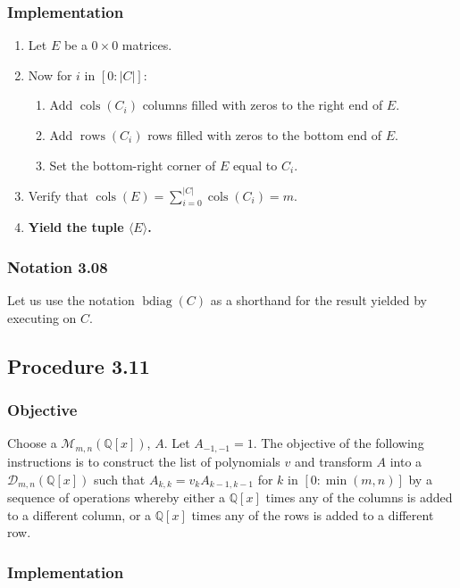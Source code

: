 \documentclass[twocolumn]{article}
\DeclareMathOperator{\bdiag}{bdiag}
\DeclareMathOperator{\cols}{cols}
\DeclareMathOperator{\rows}{rows}
\newcommand{\notation}[1]{\subsubsection*{Notation #1}}
\newcommand{\procedure}[2][]{\subsection*{Procedure #2 \ifthenelse{\equal{#1}{}}{}{(#1)}}\label{sec:procedure #2}}
\newcommand{\objective}{\subsubsection*{Objective}}
\newcommand{\implementation}{\subsubsection*{Implementation}}
\newcommand{\procedurehr}[2][]{\hyperref[sec:procedure #2]{\ifthenelse{\equal{#1}{}}{procedure #2}{#1}}}
\begin{document}
			\implementation
				\begin{enumerate}
					\item Let $E$ be a $0\times 0$ matrices.
					\item Now for $i$ in $[0:\lvert C\rvert]$:
					\begin{enumerate}
						\item Add $\cols(C_i)$ columns filled with zeros to the right end of $E$.
						\item Add $\rows(C_i)$ rows filled with zeros to the bottom end of $E$.
						\item Set the bottom-right corner of $E$ equal to $C_i$.
					\end{enumerate}
					\item Verify that $\cols(E)=\sum_{i=0}^{\lvert C\rvert}\cols(C_i)=m$.
					\item \textbf{Yield the tuple $\langle E\rangle$.}
				\end{enumerate}
		\notation{3.08}
			Let us use the notation $\bdiag(C)$ as a shorthand for the result yielded by executing \procedurehr{3.10} on $C$.
		\procedure{3.11}
			\objective
				Choose a $\mathcal{M}_{m,n}(\mathbb{Q}[x])$, $A$. Let $A_{-1,-1}=1$. The objective of the following instructions is to construct the list of polynomials $v$ and transform $A$ into a $\mathcal{D}_{m,n}(\mathbb{Q}[x])$ such that $A_{k,k}=v_kA_{k-1,k-1}$ for $k$ in $[0:\min(m,n)]$ by a sequence of operations whereby either a $\mathbb{Q}[x]$ times any of the columns is added to a different column, or a $\mathbb{Q}[x]$ times any of the rows is added to a different row.
			\implementation
\end{document}
